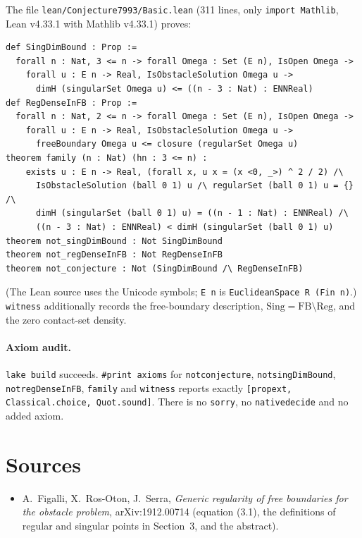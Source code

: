 \documentclass[11pt]{article}
\theoremstyle{definition}
\theoremstyle{remark}
\renewcommand{\_}{\oldus\allowbreak}
\begin{document}
The file \texttt{lean/Conjecture7993/Basic.lean} (311 lines, only \texttt{import Mathlib}, Lean
v4.33.1 with Mathlib v4.33.1) proves:
\begin{verbatim}
def SingDimBound : Prop :=
  forall n : Nat, 3 <= n -> forall Omega : Set (E n), IsOpen Omega ->
    forall u : E n -> Real, IsObstacleSolution Omega u ->
      dimH (singularSet Omega u) <= ((n - 3 : Nat) : ENNReal)
def RegDenseInFB : Prop :=
  forall n : Nat, 2 <= n -> forall Omega : Set (E n), IsOpen Omega ->
    forall u : E n -> Real, IsObstacleSolution Omega u ->
      freeBoundary Omega u <= closure (regularSet Omega u)
theorem family (n : Nat) (hn : 3 <= n) :
    exists u : E n -> Real, (forall x, u x = (x <0, _>) ^ 2 / 2) /\
      IsObstacleSolution (ball 0 1) u /\ regularSet (ball 0 1) u = {} /\
      dimH (singularSet (ball 0 1) u) = ((n - 1 : Nat) : ENNReal) /\
      ((n - 3 : Nat) : ENNReal) < dimH (singularSet (ball 0 1) u)
theorem not_singDimBound : Not SingDimBound
theorem not_regDenseInFB : Not RegDenseInFB
theorem not_conjecture : Not (SingDimBound /\ RegDenseInFB)
\end{verbatim}
(The Lean source uses the Unicode symbols; \texttt{E n} is \texttt{EuclideanSpace R (Fin n)}.)
\texttt{witness} additionally records the free-boundary description, $\mathrm{Sing}=\mathrm{FB}\setminus\mathrm{Reg}$,
and the zero contact-set density.

\paragraph{Axiom audit.} \texttt{lake build} succeeds. \texttt{\#print axioms} for
\texttt{not\_conjecture}, \texttt{not\_singDimBound}, \texttt{not\_regDenseInFB}, \texttt{family}
and \texttt{witness} reports exactly \texttt{[propext, Classical.choice, Quot.sound]}. There is no
\texttt{sorry}, no \texttt{native\_decide} and no added axiom.

\section*{Sources}
\begin{itemize}[nosep]
\item A.~Figalli, X.~Ros-Oton, J.~Serra, \emph{Generic regularity of free boundaries for the
  obstacle problem}, arXiv:1912.00714 (equation (3.1), the definitions of regular and singular points
  in Section~3, and the abstract).
\end{itemize}
\end{document}
